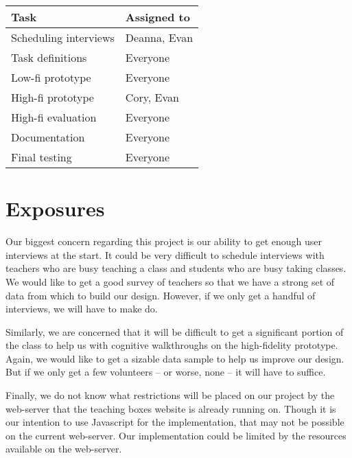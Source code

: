 \documentclass[11pt,letter]{article}
\begin{document}
\hfill
\linebreak
\begin{tabular}[!h]{ll}
	\textbf{Task}         & \textbf{Assigned to} \\
	\hline
	Scheduling interviews & Deanna, Evan \\
	Task definitions      & Everyone \\
	Low-fi prototype      & Everyone \\
	High-fi prototype     & Cory, Evan \\
	High-fi evaluation    & Everyone \\
	Documentation         & Everyone \\
	Final testing         & Everyone
\end{tabular}

\section{Exposures}
Our biggest concern regarding this project is our ability to get enough user
interviews at the start. It could be very difficult to schedule interviews with
teachers who are busy teaching a class and students who are busy taking classes.
We would like to get a good survey of teachers so that we have a strong set of
data from which to build our design. However, if we only get a handful of
interviews, we will have to make do.

Similarly, we are concerned that it will be difficult to get a significant
portion of the class to help us with cognitive walkthroughs on the high-fidelity
prototype. Again, we would like to get a sizable data sample to help us improve
our design. But if we only get a few volunteers -- or worse, none -- it will
have to suffice.

Finally, we do not know what restrictions will be placed on our project by the
web-server that the teaching boxes website is already running on. Though it is
our intention to use Javascript for the implementation, that may not be possible
on the current web-server. Our implementation could be limited by the resources
available on the web-server.
\end{document}
